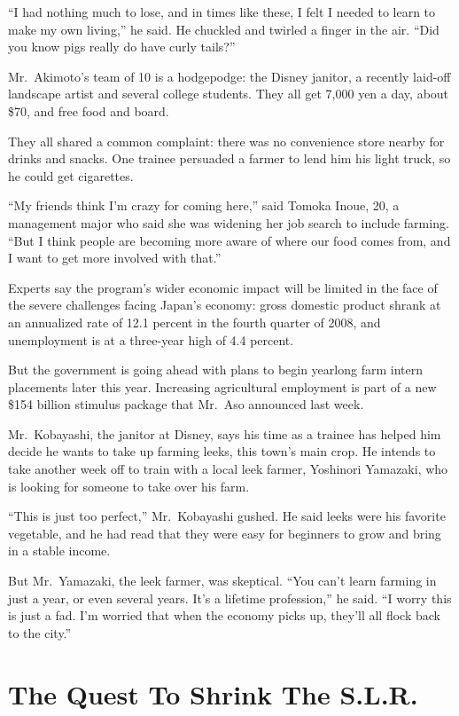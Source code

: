 \documentclass[12pt,a4paper,onecolumn]{article}
\begin{document}
``I had nothing much to lose, and in times like these, I felt I needed to learn to make my own
living,'' he said. He chuckled and twirled a finger in the air. ``Did you know pigs really do have
curly tails?''

Mr.~Akimoto's team of 10 is a hodgepodge: the Disney janitor, a recently laid-off landscape artist
and several college students. They all get 7,000 yen a day, about \$70, and free food and board.

They all shared a common complaint: there was no convenience store nearby for drinks and snacks. One
trainee persuaded a farmer to lend him his light truck, so he could get cigarettes.

``My friends think I'm crazy for coming here,'' said Tomoka Inoue, 20, a management major who said
she was widening her job search to include farming. ``But I think people are becoming more aware of
where our food comes from, and I want to get more involved with that.''

Experts say the program's wider economic impact will be limited in the face of the severe challenges
facing Japan's economy: gross domestic product shrank at an annualized rate of 12.1 percent in the
fourth quarter of 2008, and unemployment is at a three-year high of 4.4 percent.

But the government is going ahead with plans to begin yearlong farm intern placements later this
year. Increasing agricultural employment is part of a new \$154 billion stimulus package that
Mr.~Aso announced last week.

Mr.~Kobayashi, the janitor at Disney, says his time as a trainee has helped him decide he wants to
take up farming leeks, this town's main crop. He intends to take another week off to train with a
local leek farmer, Yoshinori Yamazaki, who is looking for someone to take over his farm.

``This is just too perfect,'' Mr.~Kobayashi gushed. He said leeks were his favorite vegetable, and
he had read that they were easy for beginners to grow and bring in a stable income.

But Mr.~Yamazaki, the leek farmer, was skeptical. ``You can't learn farming in just a year, or even
several years. It's a lifetime profession,'' he said. ``I worry this is just a fad. I'm worried that
when the economy picks up, they'll all flock back to the city.''

\section{The Quest To Shrink The S.L.R.}
\end{document}
